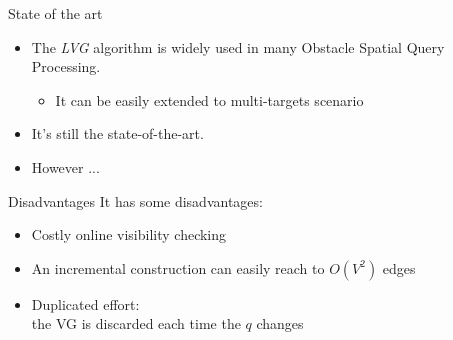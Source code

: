 \begin{frame}{State of the art}
\begin{itemize}
    \item \small{The \textit{LVG} algorithm is widely used in many Obstacle Spatial Query Processing.}
        \begin{itemize}
            \item \small It can be easily extended to multi-targets scenario
        \end{itemize}
    \item \small It's still the state-of-the-art.
    \item \small However ...
\end{itemize}
\end{frame}

\begin{frame}{Disadvantages}
It has some disadvantages:
\begin{itemize}
    \item \small Costly online visibility checking
    \item \small {An incremental construction can easily reach to $O(V^2)$ edges}
    \item \small {Duplicated effort:\\
    the VG is discarded each time the $q$ changes}
\end{itemize}
\end{frame}
